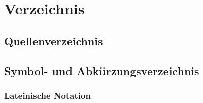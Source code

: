 	\pagestyle{fancy}
	\section{Verzeichnis}
	\subsection{Quellenverzeichnis}
	\renewcommand\refname{\vskip -1cm}
	
	
	\subsection{Symbol- und Abkürzungsverzeichnis}
	
	\subsubsection*{Lateinische Notation}
